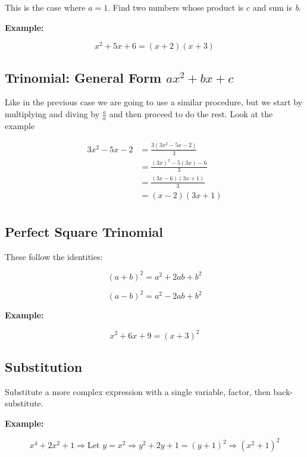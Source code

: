 This is the case where \(a = 1\). Find two numbers whose product is \(c\) and sum is \emph{b}.
\vspace{\baselineskip}

\textbf{Example:}

\[
  x^2 + 5x + 6 = (x + 2)(x + 3)
\]

\subsection{Trinomial: General Form \texorpdfstring{\(ax^2 + bx + c\)}{ax² + bx + c}}

Like in the previous case we are going to use a similar procedure, but we start by
multiplying and diving by \(\frac{a}{a}\) and then proceed to do the rest. Look at the example

\begin{align*}
3x^2 -5x - 2 &= \frac{3(3x^2 -5x - 2)}{3} \\
             &= \frac{{(3x)}^2 -5(3x) - 6}{3}\\ 
             &= \frac{(3x- 6)(3x+1)}{3} \\
             &= (x- 2)(3x +1) \\
\end{align*}


\subsection{Perfect Square Trinomial}

These follow the identities:

\[
  {(a + b)}^2 = a^2 + 2ab + b^2
\]

\[
  {(a - b)}^2 = a^2 - 2ab + b^2
\]

\textbf{Example:}
\vspace{\baselineskip}

\[
  x^2 + 6x + 9 = {(x + 3)}^2
\]

\subsection{Substitution}

Substitute a more complex expression with a single variable, factor, then back-substitute.
\vspace{\baselineskip}

\textbf{Example:}

\[
  x^4 + 2x^2 + 1 \Rightarrow \text{Let } y = x^2 \Rightarrow y^2 + 2y + 1 = {(y + 1)}^2 
  \Rightarrow {(x^2 + 1)}^2
\]

